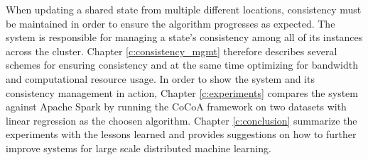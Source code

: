 When updating a shared state from multiple different locations, consistency must be maintained in order to ensure the algorithm progresses as expected. The system is responsible for managing a state's consistency among all of its instances across the cluster. Chapter \ref{c:consistency_mgmt} therefore describes several schemes for ensuring consistency and at the same time optimizing for bandwidth and computational resource usage.
In order to show the system and its consistency management in action, Chapter \ref{c:experiments} compares the system against Apache Spark by running the CoCoA framework on two datasets with linear regression as the choosen algorithm.
Chapter \ref{c:conclusion} summarize the experiments with the lessons learned and provides suggestions on how to further improve systems for large scale distributed machine learning.
